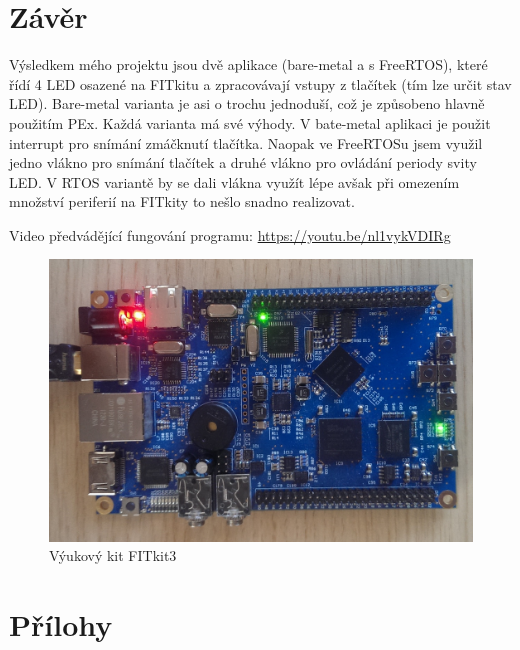 \documentclass[a4paper]{article}
\begin{document}
\newpage

\section{Závěr}
Výsledkem mého projektu jsou dvě aplikace (bare-metal a s FreeRTOS), které řídí 4 LED osazené na FITkitu a zpracovávají vstupy z tlačítek (tím lze určit stav LED). Bare-metal varianta je asi o trochu jednoduší, což je způsobeno hlavně použitím PEx. Každá varianta má své výhody. V bate-metal aplikaci je použit interrupt pro snímání zmáčknutí tlačítka. Naopak ve FreeRTOSu jsem využil jedno vlákno pro snímání tlačítek a druhé vlákno pro ovládání periody svity LED. V RTOS variantě by se dali vlákna využít lépe avšak při omezením množství periferií na FITkity to nešlo snadno realizovat.

Video předvádějící fungování programu: \url{https://youtu.be/nl1vykVDIRg}


\begin{figure}[h]
	\includegraphics[width=\textwidth]{fitkit3-foto.jpg}
	\caption{Výukový kit FITkit3}
	\label{fitkit3-foto}
\end{figure}


\newpage
\section*{Přílohy}
\end{document}

